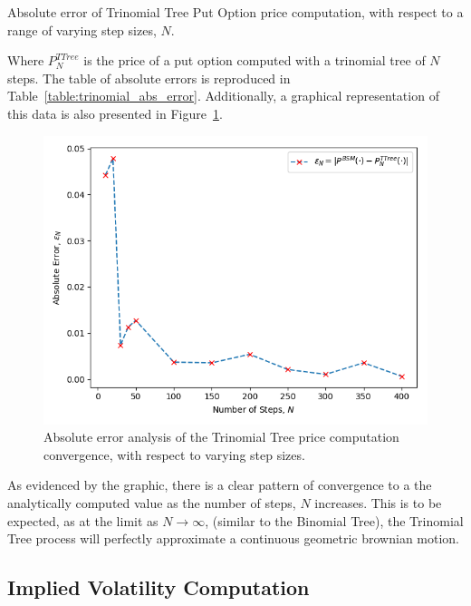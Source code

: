 \documentclass[10pt]{article}
\begin{document}
        \begin{table}[!h]
            \centering
            \caption{Absolute error of Trinomial Tree Put Option price computation, with respect to a range of varying step sizes, $N$.}
            \label{table:trinomial_abs_error}
        \end{table}
    
        Where $P^{TTree}_N$ is the price of a put option computed with a trinomial tree of $N$ steps. The table of absolute errors is reproduced in Table~\ref{table:trinomial_abs_error}. Additionally, a graphical representation of this data is also presented in Figure~\ref{fig:trinomial_abs_error}.
    
        \begin{figure}[!ht]
            \includegraphics[]{bin/trinomial_abs_error_plot.png}
            \caption{Absolute error analysis of the Trinomial Tree price computation convergence, with respect to varying step sizes.}
            \label{fig:trinomial_abs_error}
        \end{figure}
    
        As evidenced by the graphic, there is a clear pattern of convergence to a the analytically computed value as the number of steps, $N$ increases. This is to be expected, as at the limit as $N \rightarrow \infty$, (similar to the Binomial Tree), the Trinomial Tree process will perfectly approximate a continuous geometric brownian motion.
    
        \newpage
        \subsection{Implied Volatility Computation}
        
\end{document}
